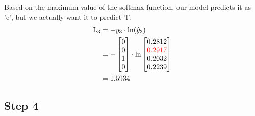 \documentclass{article}
\begin{document}
Based on the maximum value of the softmax function, our model predicts it as 'e', but we actually want it to predict 'l'.
\begin{align*}
    \text{L}_{3} & = -y_3 \cdot \ln(\hat{y}_3) \\
    &=-\begin{bmatrix} 0 \\ 0 \\ 1 \\ 0 \end{bmatrix} \cdot \ln{\begin{bmatrix} 0.2812 \\ \textcolor{red}{0.2917} \\ 0.2032 \\ 0.2239 \end{bmatrix}}\\
    &=1.5934
\end{align*}
\subsection{Step 4}
\end{document}
